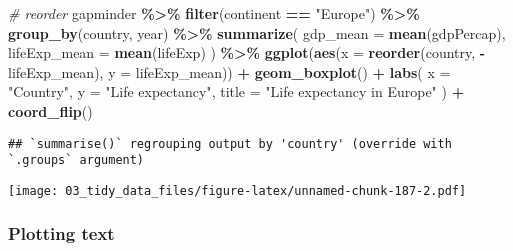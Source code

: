 \documentclass[
]{book}
\newenvironment{Shaded}{\begin{snugshade}}{\end{snugshade}}
\newcommand{\CommentTok}[1]{\textcolor[rgb]{0.56,0.35,0.01}{\textit{#1}}}
\newcommand{\DataTypeTok}[1]{\textcolor[rgb]{0.13,0.29,0.53}{#1}}
\newcommand{\KeywordTok}[1]{\textcolor[rgb]{0.13,0.29,0.53}{\textbf{#1}}}
\newcommand{\NormalTok}[1]{#1}
\newcommand{\OperatorTok}[1]{\textcolor[rgb]{0.81,0.36,0.00}{\textbf{#1}}}
\newcommand{\StringTok}[1]{\textcolor[rgb]{0.31,0.60,0.02}{#1}}
\begin{document}
\begin{Shaded}
\begin{Highlighting}[]
\CommentTok{\# reorder}
\NormalTok{gapminder }\OperatorTok{\%\textgreater{}\%}
\StringTok{  }\KeywordTok{filter}\NormalTok{(continent }\OperatorTok{==}\StringTok{ "Europe"}\NormalTok{) }\OperatorTok{\%\textgreater{}\%}
\StringTok{  }\KeywordTok{group\_by}\NormalTok{(country, year) }\OperatorTok{\%\textgreater{}\%}
\StringTok{  }\KeywordTok{summarize}\NormalTok{(}
    \DataTypeTok{gdp\_mean =} \KeywordTok{mean}\NormalTok{(gdpPercap),}
    \DataTypeTok{lifeExp\_mean =} \KeywordTok{mean}\NormalTok{(lifeExp)}
\NormalTok{  ) }\OperatorTok{\%\textgreater{}\%}
\StringTok{  }\KeywordTok{ggplot}\NormalTok{(}\KeywordTok{aes}\NormalTok{(}\DataTypeTok{x =} \KeywordTok{reorder}\NormalTok{(country, }\OperatorTok{{-}}\NormalTok{lifeExp\_mean), }\DataTypeTok{y =}\NormalTok{ lifeExp\_mean)) }\OperatorTok{+}
\StringTok{  }\KeywordTok{geom\_boxplot}\NormalTok{() }\OperatorTok{+}
\StringTok{  }\KeywordTok{labs}\NormalTok{(}
    \DataTypeTok{x =} \StringTok{"Country"}\NormalTok{,}
    \DataTypeTok{y =} \StringTok{"Life expectancy"}\NormalTok{,}
    \DataTypeTok{title =} \StringTok{"Life expectancy in Europe"}
\NormalTok{  ) }\OperatorTok{+}
\StringTok{  }\KeywordTok{coord\_flip}\NormalTok{()}
\end{Highlighting}
\end{Shaded}

\begin{verbatim}
## `summarise()` regrouping output by 'country' (override with `.groups` argument)
\end{verbatim}

\texttt{[image: 03\_tidy\_data\_files/figure-latex/unnamed-chunk-187-2.pdf]}

\hypertarget{plotting-text}{%
\subsubsection{Plotting text}\label{plotting-text}}
\end{document}
